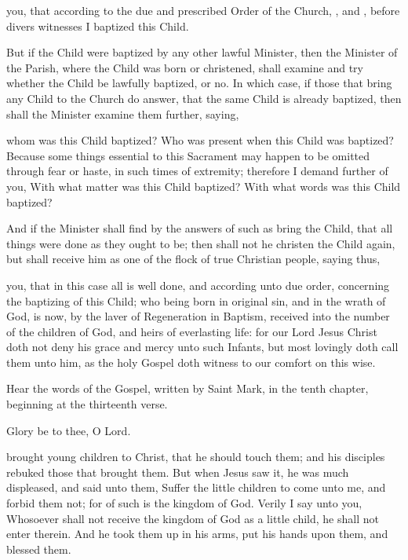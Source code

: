  you, that according to the due and prescribed Order of the Church, , and , before divers witnesses I baptized this Child.

\begin{rubric}
But if the Child were baptized by any other lawful Minister, then the Minister of the Parish, where the Child was born or christened, shall examine and try whether the Child be lawfully baptized, or no.
In which case, if those that bring any Child to the Church do answer, that the same Child is already baptized, then shall the Minister examine them further, saying,
\end{rubric}

 whom was this Child baptized?
Who was present when this Child was baptized?
Because some things essential to this Sacrament may happen to be omitted through fear or haste, in such times of extremity; therefore I demand further of you,
With what matter was this Child baptized?
With what words was this Child baptized?

\begin{rubric}
And if the Minister shall find by the answers of such as bring the Child, that all things were done as they ought to be; then shall not he christen the Child again, but shall receive him as one of the flock of true Christian people, saying thus,
\end{rubric}

 you, that in this case all is well done, and according unto due order, concerning the baptizing of this Child; who being born in original sin, and in the wrath of God, is now, by the laver of Regeneration in Baptism, received into the number of the children of God, and heirs of everlasting life: for our Lord Jesus Christ doth not deny his grace and mercy unto such Infants, but most lovingly doth call them unto him, as the holy Gospel doth witness to our comfort on this wise.

\begin{leftbar}

\begin{center}
Hear the words of the Gospel, written by Saint Mark, in the tenth chapter, beginning at the thirteenth verse.
\end{center}

 Glory be to thee, O Lord.

\end{leftbar}

 brought young children to Christ, that he should touch them; and his disciples rebuked those that brought them.
But when Jesus saw it, he was much displeased, and said unto them, Suffer the little children to come unto me, and forbid them not; for of such is the kingdom of God.
Verily I say unto you, Whosoever shall not receive the kingdom of God as a little child, he shall not enter therein.
And he took them up in his arms, put his hands upon them, and blessed them.

